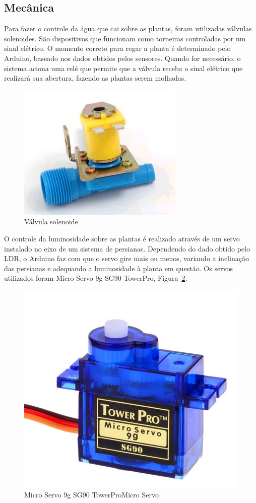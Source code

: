 \documentclass[a4paper,12pt]{report}
\begin{document}
			
		
		\subsection{Mecânica}
			Para fazer o controle da água que cai sobre as plantas, foram utilizadas válvulas solenoides. São dispositivos que funcionam como torneiras controladas por um sinal elétrico. O momento correto para regar a planta é determinado pelo Arduino, baseado nos dados obtidos pelos sensores. Quando for necessário, o sistema aciona uma relé que permite que a válvula receba o sinal elétrico que realizará sua abertura, fazendo as plantas serem molhadas.	
			
			\begin{figure}[!htb]
				\centering
				\includegraphics{valvula}
				\caption{Válvula solenoide}
				\label{Rotulo}
			\end{figure}
		
			O controle da luminosidade sobre as plantas é realizado através de um servo instalado no eixo de um sistema de persianas. Dependendo do dado obtido pelo LDR, o Arduino faz com que o servo gire mais ou menos, variando a inclinação das persianas e adequando a luminosidade à planta em questão. Os servos utilizados foram Micro Servo 9g SG90 TowerPro, Figura~\ref{fig:SERVO}. 
			
				
			\begin{figure}[!h]
				\centering
				\includegraphics[width=0.4\linewidth]{figs/servo}
				\caption{Micro Servo 9g SG90 TowerProMicro Servo}
				\label{fig:SERVO}
			\end{figure}
		
\end{document}

